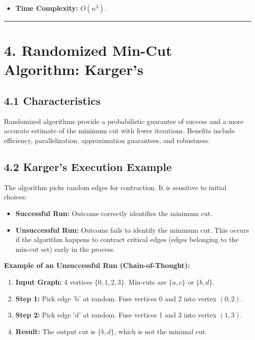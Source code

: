 \documentclass[12pt]{article}
\begin{document}
\begin{itemize}
\item \textbf{Time Complexity:} $O(n^3)$.
\end{itemize}

\hrule
\vspace{0.5em}

\section*{4. Randomized Min-Cut Algorithm: Karger's}

\subsection*{4.1 Characteristics}

Randomized algorithms provide a probabilistic guarantee of success and a more accurate estimate of the minimum cut with fewer iterations. Benefits include efficiency, parallelization, approximation guarantees, and robustness.

\subsection*{4.2 Karger's Execution Example}

The algorithm picks random edges for contraction. It is sensitive to initial choices:

\begin{itemize}
\item \textbf{Successful Run:} Outcome correctly identifies the minimum cut.

\item \textbf{Unsuccessful Run:} Outcome fails to identify the minimum cut. This occurs if the algorithm happens to contract critical edges (edges belonging to the min-cut set) early in the process.
\end{itemize}

\textbf{Example of an Unsuccessful Run (Chain-of-Thought):}

\begin{enumerate}
\item \textbf{Input Graph:} 4 vertices $\{0,1,2,3\}$. Min-cuts are $\{a,c\}$ or $\{b,d\}$.

\item \textbf{Step 1:} Pick edge 'b' at random. Fuse vertices 0 and 2 into vertex $(0,2)$.

\item \textbf{Step 2:} Pick edge 'd' at random. Fuse vertices 1 and 3 into vertex $(1,3)$.

\item \textbf{Result:} The output cut is $\{b,d\}$, which is not the minimal cut.
\end{enumerate}
\end{document}
